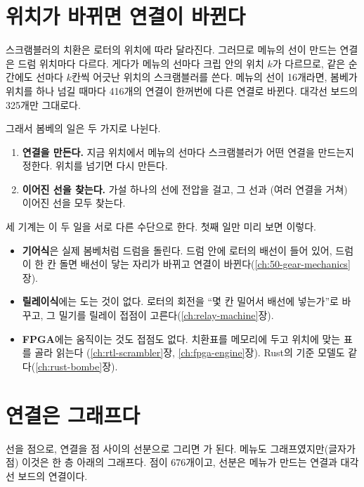 \section{위치가 바뀌면 연결이 바뀐다}\label{sec:c-position}

스크램블러의 치환은 로터의 위치에 따라 달라진다. 그러므로 메뉴의 선이 만드는 연결은 드럼 위치마다 다르다.
게다가 메뉴의 선마다 크립 안의 위치 $k$가 다르므로, 같은 순간에도 선마다 $k$칸씩 어긋난 위치의 스크램블러를 쓴다.
메뉴의 선이 16개라면, 봄베가 위치를 하나 넘길 때마다 416개의 연결이 한꺼번에 다른 연결로 바뀐다. 대각선 보드의
325개만 그대로다.

그래서 봄베의 일은 두 가지로 나뉜다.

\begin{keybox}[title={봄베의 두 가지 일}]
\begin{enumerate}
\item \textbf{연결을 만든다.} 지금 위치에서 메뉴의 선마다 스크램블러가 어떤 연결을 만드는지 정한다. 위치를 넘기면
다시 만든다.
\item \textbf{이어진 선을 찾는다.} 가설 하나의 선에 전압을 걸고, 그 선과 (여러 연결을 거쳐) 이어진 선을 모두 찾는다.
\end{enumerate}
\end{keybox}

세 기계는 이 두 일을 서로 다른 수단으로 한다. 첫째 일만 미리 보면 이렇다.

\begin{itemize}
\item \textbf{기어식}은 실제 봄베처럼 드럼을 돌린다. 드럼 안에 로터의 배선이 들어 있어, 드럼이 한 칸 돌면 배선이
닿는 자리가 바뀌고 연결이 바뀐다(\ref{ch:50-gear-mechanics}장).
\item \textbf{릴레이식}에는 도는 것이 없다. 로터의 회전을 ``몇 칸 밀어서 배선에 넣는가''로 바꾸고, 그 밀기를
릴레이 접점이 고른다(\ref{ch:relay-machine}장).
\item \textbf{FPGA}에는 움직이는 것도 접점도 없다. 치환표를 메모리에 두고 위치에 맞는 표를 골라 읽는다
(\ref{ch:rtl-scrambler}장, \ref{ch:fpga-engine}장). Rust의 기준 모델도 같다(\ref{ch:rust-bombe}장).
\end{itemize}

\section{연결은 그래프다}\label{sec:c-graph}

선을 점으로, 연결을 점 사이의 선분으로 그리면 가 된다. 메뉴도 그래프였지만(글자가 점) 이것은
한 층 아래의 그래프다. 점이 676개이고, 선분은 메뉴가 만드는 연결과 대각선 보드의 연결이다.

